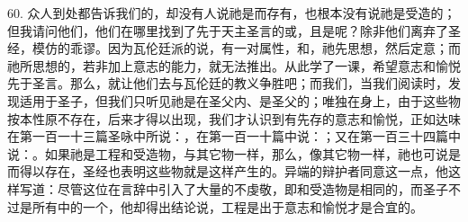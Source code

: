 60. 众人到处都告诉我们的，却没有人说祂是而存有，也根本没有说祂是受造的；但我请问他们，他们在哪里找到了先于天主圣言的或，且是呢？除非他们离弃了圣经，模仿的乖谬。因为瓦伦廷派的说，有一对属性，和，祂先思想，然后定意；而祂所思想的，若非加上意志的能力，就无法推出。从此学了一课，希望意志和愉悦先于圣言。那么，就让他们去与瓦伦廷的教义争胜吧；而我们，当我们阅读时，发现适用于圣子，但我们只听见祂是在圣父内、是圣父的；唯独在身上，由于这些物按本性原不存在，后来才得以出现，我们才认识到有先存的意志和愉悦，正如达味在第一百一十三篇圣咏中所说：，在第一百一十篇中说：；又在第一百三十四篇中说：。如果祂是工程和受造物，与其它物一样，那么，像其它物一样，祂也可说是而得以存在，圣经也表明这些物就是这样产生的。异端的辩护者同意这一点，他这样写道：尽管这位在言辞中引入了大量的不虔敬，即和受造物是相同的，而圣子不过是所有中的一个，他却得出结论说，工程是出于意志和愉悦才是合宜的。\par

